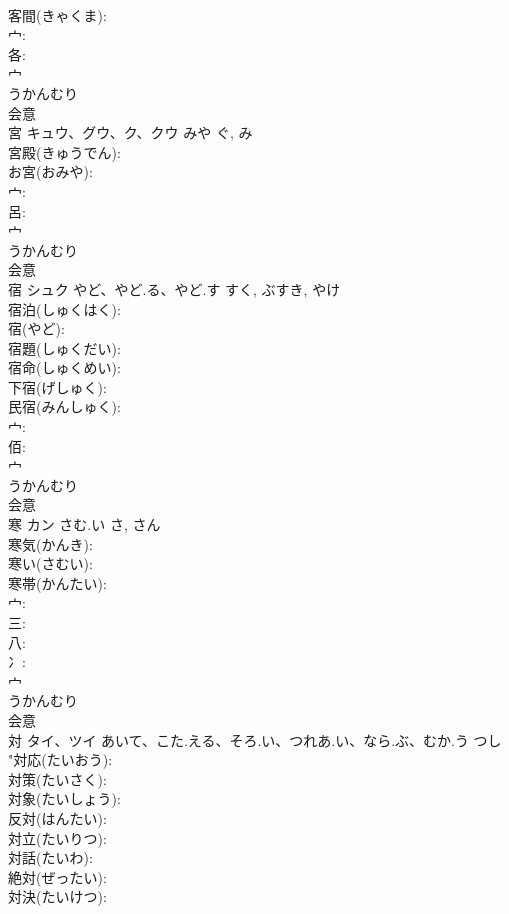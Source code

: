 \documentclass[8pt]{extreport}
\begin{document}
\begin{CJK}{UTF8}{min}
\\	客間(きゃくま): 
\\	宀: 
\\	各: 
\\	宀	
\\	うかんむり	
\\	会意 
\\	宮	キュウ、グウ、ク、クウ	みや	ぐ, み	
\\	宮殿(きゅうでん): 
\\	お宮(おみや): 
\\	宀: 
\\	呂: 
\\	宀	
\\	うかんむり	
\\	会意 
\\	宿	シュク	やど、やど.る、やど.す	すく, ぶすき, やけ	
\\	宿泊(しゅくはく): 
\\	宿(やど): 
\\	宿題(しゅくだい): 
\\	宿命(しゅくめい): 
\\	下宿(げしゅく): 
\\	民宿(みんしゅく): 
\\	宀: 
\\	佰: 
\\	宀	
\\	うかんむり	
\\	会意 
\\	寒	カン	さむ.い	さ, さん	
\\	寒気(かんき): 
\\	寒い(さむい): 
\\	寒帯(かんたい): 
\\	宀: 
\\	三: 
\\	八: 
\\	冫: 
\\	宀	
\\	うかんむり	
\\	会意 
\\	対	タイ、ツイ	あいて、こた.える、そろ.い、つれあ.い、なら.ぶ、むか.う	つし	
\\	"対応(たいおう): 
\\	対策(たいさく): 
\\	対象(たいしょう): 
\\	反対(はんたい): 
\\	対立(たいりつ): 
\\	対話(たいわ): 
\\	絶対(ぜったい): 
\\	対決(たいけつ): 

\end{CJK}
\end{document}
